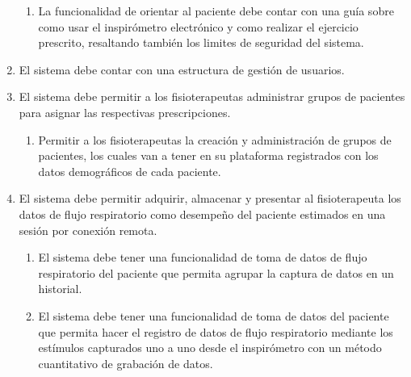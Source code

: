 \documentclass[12pt]{article}
\begin{document}
\begin{enumerate}[start=1,label={\bfseries RF0\arabic*.}]
\begin{enumerate}[label*=\arabic*.]
                \item La funcionalidad de orientar al paciente debe contar con una guía sobre como usar el inspirómetro electrónico y como realizar el ejercicio prescrito, resaltando también los limites de seguridad del sistema.
            \end{enumerate}
            
            


 
    \item El sistema debe contar con una estructura de gestión de usuarios.
    \item El sistema debe permitir a los fisioterapeutas administrar grupos de pacientes para asignar las respectivas prescripciones.
    \label{RF10}
        \begin{enumerate}[label*=\arabic*.]
            \item Permitir a los fisioterapeutas la creación y administración de grupos de pacientes, los cuales van a tener en su plataforma registrados con los datos demográficos de cada paciente.
            
        \end{enumerate}
        
  
            

         
    
 
    
    
    \item El sistema debe permitir adquirir, almacenar y presentar al fisioterapeuta los datos de flujo respiratorio  como desempeño del paciente estimados en una sesión por conexión remota.
    
     \label{RF12}
            \begin{enumerate}[label*=\arabic*.]
                
                \item El sistema debe tener una funcionalidad de toma de datos de flujo respiratorio del paciente que permita agrupar la captura de datos en un historial.
                
                \item El sistema debe tener una funcionalidad de toma de datos del paciente que permita hacer el registro de datos de flujo respiratorio mediante los estímulos capturados uno a uno desde el inspirómetro con un método cuantitativo de grabación de datos.  %
                

\end{enumerate}
\end{enumerate}
\end{document}
